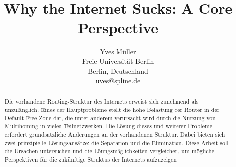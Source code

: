 \documentclass[11pt,a4paper]{article}
\author{Yves Müller \\ Freie Universität Berlin \\ Berlin, Deutschland \\ uves@spline.de}
\title{Why the Internet Sucks: A Core Perspective}
\date{}
\begin{document}
\maketitle

\begin{abstract}
Die vorhandene Routing-Struktur des Internets erweist sich zunehmend als unzulänglich. Eines der Hauptprobleme stellt die hohe Belastung der Router in der Default-Free-Zone dar, die unter anderem verursacht wird durch die Nutzung von Multihoming in vielen Teilnetzwerken. Die Lösung dieses und weiterer Probleme erfordert grundsätzliche Änderungen an der vorhandenen Struktur. Dabei bieten sich zwei prinzipielle Lösungsansätze: die Separation und die Elimination. Diese Arbeit soll die Ursachen untersuchen und die Löungsmöglichkeiten vergleichen, um mögliche Perspektiven für die zukünftige Struktus der Internets aufzuzeigen.
\end{abstract}

\tableofcontents

\newpage











\end{document}
